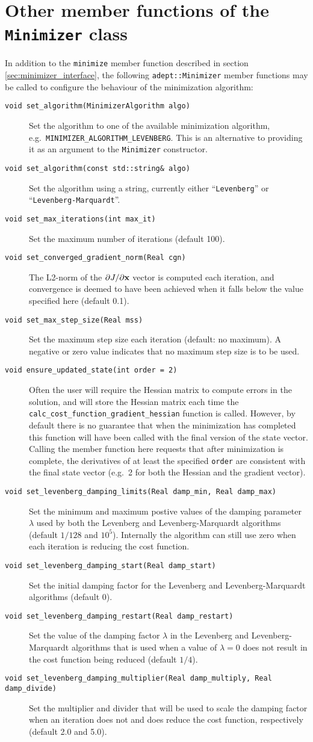\documentclass[a4,oneside]{book}
\def\codesize{\small}
\def\code#1{{\codesize\texttt{#1}}}
\def\citem#1{\item[{\codesize\texttt{#1}}]}
\begin{document}
\section{Other member functions of the \code{Minimizer} class}
\label{sec:minimizer_options}
In addition to the \code{minimize} member function described in
section \ref{sec:minimizer_interface}, the following
\code{adept::Minimizer} member functions may be called to configure
the behaviour of the minimization algorithm:
\begin{description}
\citem{void set\_algorithm(MinimizerAlgorithm algo)} Set the algorithm
to one of the available minimization algorithm,
e.g.\ \code{MINIMIZER\_ALGORITHM\_LEVENBERG}. This is an alternative
to providing it as an argument to the \code{Minimizer} constructor.
%
\citem{void set\_algorithm(const std::string\&\ algo)} Set the algorithm
using a string, currently either ``\code{Levenberg}'' or
``\code{Levenberg-Marquardt}''.
%
\citem{void set\_max\_iterations(int max\_it)} Set the maximum number
of iterations (default 100).
%
\citem{void set\_converged\_gradient\_norm(Real cgn)} The L2-norm of
the $\partial J/\partial{\bf x}$ vector is computed each iteration,
and convergence is deemed to have been achieved when it falls below
the value specified here (default 0.1).
%
\citem{void set\_max\_step\_size(Real mss)} Set the maximum step size
each iteration (default: no maximum). A negative or zero value
indicates that no maximum step size is to be used.
%
\citem{void ensure\_updated\_state(int order = 2)} Often the user will
require the Hessian matrix to compute errors in the solution, and will
store the Hessian matrix each time the
\code{calc\_cost\_function\_gradient\_hessian} function is
called. However, by default there is no guarantee that when the
minimization has completed this function will have been called with the
final version of the state vector.  Calling the member function here
requests that after minimization is complete, the derivatives of at
least the specified \code{order} are consistent with the final state
vector (e.g.\ 2 for both the Hessian and the gradient vector).
%
\citem{void set\_levenberg\_damping\_limits(Real damp\_min, Real
  damp\_max)} Set the minimum and maximum postive values of the
damping parameter $\lambda$ used by both the Levenberg and
Levenberg-Marquardt algorithms (default $1/128$ and
$10^5$). Internally the algorithm can still use zero when each
iteration is reducing the cost function.
%
\citem{void set\_levenberg\_damping\_start(Real damp\_start)} Set the
initial damping factor for the Levenberg and Levenberg-Marquardt
algorithms (default 0).
%
\citem{void set\_levenberg\_damping\_restart(Real damp\_restart)} Set
the value of the damping factor $\lambda$ in the Levenberg and
Levenberg-Marquardt algorithms that is used when a value of
$\lambda=0$ does not result in the cost function being reduced
(default $1/4$).
%
\citem{void set\_levenberg\_damping\_multiplier(Real damp\_multiply,
  Real damp\_divide)} Set the multiplier and divider that will be used
to scale the damping factor when an iteration does not and does reduce
the cost function, respectively (default 2.0 and 5.0).
\end{description}
\end{document}
